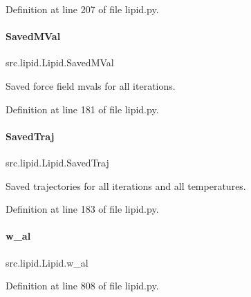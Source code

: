 Definition at line 207 of file lipid.\+py.

\mbox{\label{classsrc_1_1lipid_1_1Lipid_aba2be5f781c35d1d91895b824e229908}} 
\paragraph{\texorpdfstring{Saved\+M\+Val}{SavedMVal}}
{\footnotesize\ttfamily src.\+lipid.\+Lipid.\+Saved\+M\+Val}



Saved force field mvals for all iterations. 



Definition at line 181 of file lipid.\+py.

\mbox{\label{classsrc_1_1lipid_1_1Lipid_aaff6ba231857cb620916cfc6e2bd2609}} 
\paragraph{\texorpdfstring{Saved\+Traj}{SavedTraj}}
{\footnotesize\ttfamily src.\+lipid.\+Lipid.\+Saved\+Traj}



Saved trajectories for all iterations and all temperatures. 



Definition at line 183 of file lipid.\+py.

\mbox{\label{classsrc_1_1lipid_1_1Lipid_a8fbf8d54c0efc903909b4913d508f894}} 
\paragraph{\texorpdfstring{w\+\_\+al}{w\_al}}
{\footnotesize\ttfamily src.\+lipid.\+Lipid.\+w\+\_\+al}



Definition at line 808 of file lipid.\+py.

